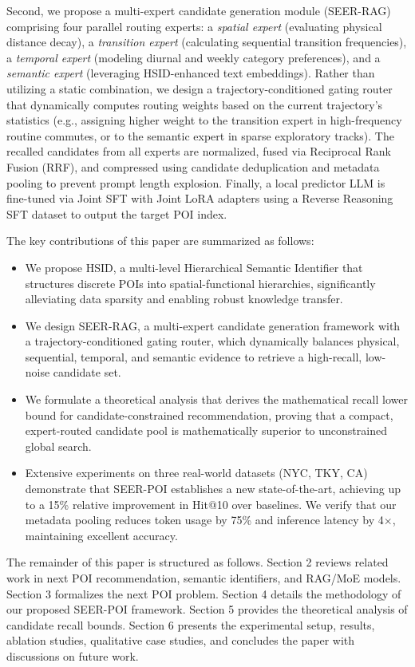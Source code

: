 \documentclass[10pt,twocolumn]{article}
\newcommand{\method}{SEER-POI}
\newcommand{\hsid}{HSID}
\begin{document}
Second, we propose a multi-expert candidate generation module (SEER-RAG) comprising four parallel routing experts: a \emph{spatial expert} (evaluating physical distance decay), a \emph{transition expert} (calculating sequential transition frequencies), a \emph{temporal expert} (modeling diurnal and weekly category preferences), and a \emph{semantic expert} (leveraging \hsid{}-enhanced text embeddings). Rather than utilizing a static combination, we design a trajectory-conditioned gating router that dynamically computes routing weights based on the current trajectory's statistics (e.g., assigning higher weight to the transition expert in high-frequency routine commutes, or to the semantic expert in sparse exploratory tracks). The recalled candidates from all experts are normalized, fused via Reciprocal Rank Fusion (RRF), and compressed using candidate deduplication and metadata pooling to prevent prompt length explosion. Finally, a local predictor LLM is fine-tuned via Joint SFT with Joint LoRA adapters using a Reverse Reasoning SFT dataset to output the target POI index.

The key contributions of this paper are summarized as follows:
\begin{itemize}
    \item We propose \hsid, a multi-level Hierarchical Semantic Identifier that structures discrete POIs into spatial-functional hierarchies, significantly alleviating data sparsity and enabling robust knowledge transfer.
    \item We design SEER-RAG, a multi-expert candidate generation framework with a trajectory-conditioned gating router, which dynamically balances physical, sequential, temporal, and semantic evidence to retrieve a high-recall, low-noise candidate set.
    \item We formulate a theoretical analysis that derives the mathematical recall lower bound for candidate-constrained recommendation, proving that a compact, expert-routed candidate pool is mathematically superior to unconstrained global search.
    \item Extensive experiments on three real-world datasets (NYC, TKY, CA) demonstrate that \method{} establishes a new state-of-the-art, achieving up to a 15\% relative improvement in Hit@10 over baselines. We verify that our metadata pooling reduces token usage by 75\% and inference latency by 4$\times$, maintaining excellent accuracy.
\end{itemize}

The remainder of this paper is structured as follows. Section 2 reviews related work in next POI recommendation, semantic identifiers, and RAG/MoE models. Section 3 formalizes the next POI problem. Section 4 details the methodology of our proposed \method{} framework. Section 5 provides the theoretical analysis of candidate recall bounds. Section 6 presents the experimental setup, results, ablation studies, qualitative case studies, and concludes the paper with discussions on future work.
\end{document}
